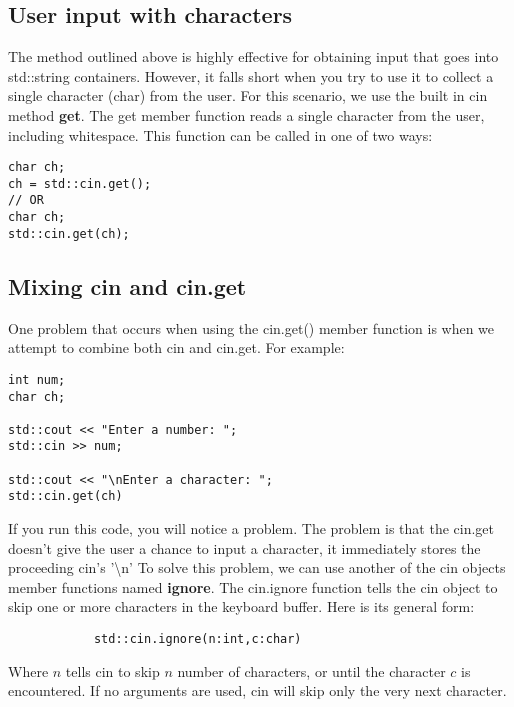 \documentclass{report}
\begin{document}
    \subsection{User input with characters}
    \bigbreak \noindent 
    The method outlined above is highly effective for obtaining input that goes into std::string containers. However, it falls short when you try to use it to collect a single character (char) from the user. 
    \bigbreak \noindent 
    For this scenario, we use the built in cin method \textbf{get}. The get member function reads a single character from the user, including whitespace. 
    \bigbreak \noindent 
    This function can be called in one of two ways:
    \smallbreak \noindent
    \sepline
    \begin{verbatim}
char ch;
ch = std::cin.get();
// OR 
char ch;
std::cin.get(ch);
    \end{verbatim}
    \sepline

    \bigbreak \noindent 
    \subsection{Mixing cin and cin.get}
    \bigbreak \noindent 
    One problem that occurs when using the cin.get() member function is when we attempt to combine both cin and cin.get. For example:
    \smallbreak \noindent
    \sepline
    \begin{verbatim}
int num;
char ch;

std::cout << "Enter a number: ";
std::cin >> num;

std::cout << "\nEnter a character: ";
std::cin.get(ch)
    \end{verbatim}
    \sepline
    \bigbreak \noindent 
    If you run this code, you will notice a problem. The problem is that the cin.get doesn't give the user a chance to input a character, it immediately stores the proceeding cin's '\textbackslash n'
    \bigbreak \noindent 
    To solve this problem, we can use another of the cin objects member functions named \textbf{ignore}. The cin.ignore function tells the cin object to skip one or more characters in the keyboard buffer. Here is its general form:
    \smallbreak \noindent
    \sepline
    \begin{verbatim}
            std::cin.ignore(n:int,c:char)
    \end{verbatim}
    \sepline
    \bigbreak \noindent 
    Where $n$ tells cin to skip $n$ number of characters, or until the character $c$ is encountered. If no arguments are used, cin will skip only the very next character.
\end{document}
